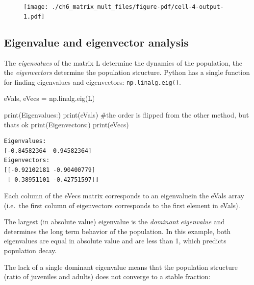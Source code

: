\documentclass[
  letterpaper,
  DIV=11,
  numbers=noendperiod]{scrreprt}
\newenvironment{Shaded}{\begin{snugshade}}{\end{snugshade}}
\newcommand{\BuiltInTok}[1]{\textcolor[rgb]{0.00,0.23,0.31}{#1}}
\newcommand{\CommentTok}[1]{\textcolor[rgb]{0.37,0.37,0.37}{#1}}
\newcommand{\NormalTok}[1]{\textcolor[rgb]{0.00,0.23,0.31}{#1}}
\newcommand{\OperatorTok}[1]{\textcolor[rgb]{0.37,0.37,0.37}{#1}}
\newcommand{\StringTok}[1]{\textcolor[rgb]{0.13,0.47,0.30}{#1}}
\begin{document}
\begin{figure}[H]

{\centering \texttt{[image: ./ch6\_matrix\_mult\_files/figure-pdf/cell-4-output-1.pdf]}

}

\end{figure}

\hypertarget{eigenvalue-and-eigenvector-analysis}{%
\subsection{Eigenvalue and eigenvector
analysis}\label{eigenvalue-and-eigenvector-analysis}}

The \emph{eigenvalues} of the matrix L determine the dynamics of the
population, the the \emph{eigenvectors} determine the population
structure. Python has a single function for finding eigenvalues and
eigenvectors: \texttt{np.linalg.eig()}.

\begin{Shaded}
\begin{Highlighting}[]
\NormalTok{eVals, eVecs }\OperatorTok{=}\NormalTok{ np.linalg.eig(L)}

\BuiltInTok{print}\NormalTok{(}\StringTok{\textquotesingle{}Eigenvalues:\textquotesingle{}}\NormalTok{)}
\BuiltInTok{print}\NormalTok{(eVals) }\CommentTok{\#the order is flipped from the other method, but that\textquotesingle{}s ok}
\BuiltInTok{print}\NormalTok{(}\StringTok{\textquotesingle{}Eigenvectors:\textquotesingle{}}\NormalTok{)}
\BuiltInTok{print}\NormalTok{(eVecs)}
\end{Highlighting}
\end{Shaded}

\begin{verbatim}
Eigenvalues:
[-0.84582364  0.94582364]
Eigenvectors:
[[-0.92102181 -0.90400779]
 [ 0.38951101 -0.42751597]]
\end{verbatim}

Each column of the eVecs matrix corresponds to an eigenvaluein the eVals
array (i.e.~the first column of eigenvectors corresponds to the first
element in eVals).

The largest (in absolute value) eigenvalue is the \emph{dominant
eigenvalue} and determines the long term behavior of the population. In
this example, both eigenvalues are equal in absolute value and are less
than 1, which predicts population decay.

The lack of a single dominant eigenvalue means that the population
structure (ratio of juveniles and adults) does not converge to a stable
fraction:
\end{document}
